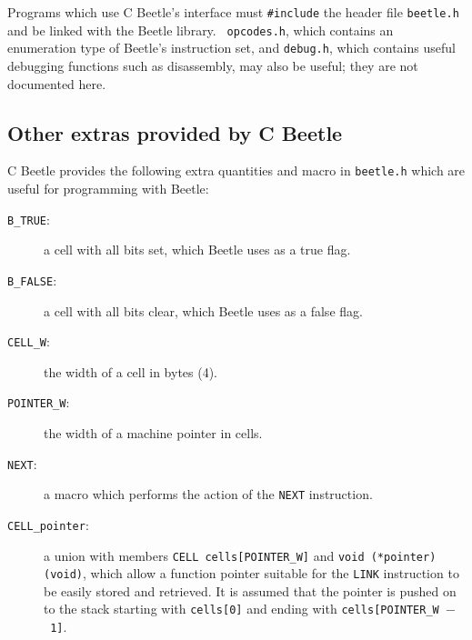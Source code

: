 \documentclass[english]{article}
\begin{document}
Programs which use C Beetle's interface must {\tt \#include} the header file
{\tt beetle.h} and be linked with the Beetle library. {\tt
opcodes.h}, which contains an enumeration type of Beetle's instruction set,
and {\tt debug.h}, which contains useful debugging functions such as
disassembly, may also be useful; they are not documented here.


\subsection{Other extras provided by C Beetle}

C Beetle provides the following extra quantities and macro in {\tt beetle.h}
which are useful for programming with Beetle:

\begin{description}
\item[{\tt B\_TRUE}:] a cell with all bits set, which Beetle uses as a true
flag.
\item[{\tt B\_FALSE}:] a cell with all bits clear, which Beetle uses as a
false flag.
\item[{\tt CELL\_W}:] the width of a cell in bytes (4).
\item[{\tt POINTER\_W}:] the width of a machine pointer in cells.
\item[{\tt NEXT}:] a macro which performs the action of the {\tt NEXT}
instruction.
\item[{\tt CELL\_pointer}:] a union with members {\tt CELL cells[POINTER\_W]} and {\tt void (*pointer)(void)}, which allow a function pointer suitable for the {\tt LINK} instruction to be easily stored and retrieved. It is assumed that the pointer is pushed on to the stack starting with {\tt cells[0]} and ending with {\tt cells[POINTER\_W~$-$~1]}.
\end{description}




\end{document}
